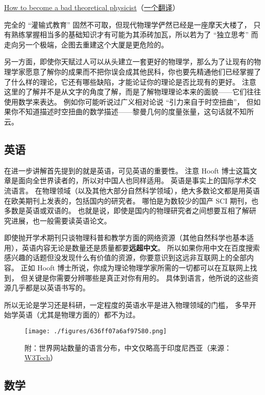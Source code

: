\href{https://webspace.science.uu.nl/~hooft101/theoristbad.html#:~:text=On\%20your\%20way\%20towards\%20becoming,have\%20your\%20work\%20published\%20anyway.}{How to become a bad theoretical physicist}（\href{https://zhuanlan.zhihu.com/p/38680467}{一个翻译}）

完全的 “灌输式教育” 固然不可取，但现代物理学俨然已经是一座摩天大楼了， 只有熟练掌握相当多的基础知识才有可能为其添砖加瓦，所以若为了 “独立思考” 而走向另一个极端，企图去重建这个大厦是更危险的。

另一方面，即使你天赋过人可以从头建立一套更好的物理学，那么为了让现有的物理学家愿意了解你的成果而不把你误会成其他民科，你也要先精通他们已经掌握了了什么样的理论，它还有哪些缺陷，才能论证你的理论是否比现有的更好。 注意这里的了解并不是从文字的角度了解，而是了解物理理论本来的面貌——它们往往使用数学来表达。 例如你可能听说过广义相对论说 “引力来自于时空扭曲”， 但如果你不知道描述时空扭曲的数学描述——黎曼几何的度量张量，这句话就不知所云。

\subsection{英语}
在进一步讲解首先提到的就是英语，可见英语的重要性。 注意 Hooft 博士这篇文章是面向全世界读者的，所以对中国人也同样适用。 英语是事实上的国际学术交流语言。 在物理领域（以及其他大部分自然科学领域），绝大多数论文都是用英语在欧美期刊上发表的，包括国内的研究者。 哪怕是为数较少的国产 SCI 期刊，也多数是英语或双语的。 也就是说，即使是国内的物理研究者之间想要互相了解研究进展，也一般需要读英语论文。

即使抛开学术期刊只谈物理科普和教学方面的网络资源（其他自然科学也基本适用），英语内容无论是数量还是质量都要\textbf{远超中文}。 所以如果你用中文在百度搜索感兴趣的话题但没发现什么有价值的资源，你要意识到这远非互联网上的全部内容。 正如 Hooft 博士所说，你成为理论物理学家所需的一切都可以在互联网上找到， 但关键是你需要分辨哪些是真正对你有用的。 具体到语言，他所说的这些资源几乎都是以英语书写的。

所以无论是学习还是科研，一定程度的英语水平是进入物理领域的门槛， 多早开始学英语（尤其是物理方面的）都不为过。

\begin{figure}[ht]
\centering
\texttt{[image: ./figures/636ff07a6af97580.png]}
\caption{附：世界网站数量的语言分布，中文仅略高于印度尼西亚（来源：\href{https://w3techs.com/technologies/overview/content_language}{W3Tech}）} \label{fig_SdyPhy_2}
\end{figure}

\subsection{数学}
